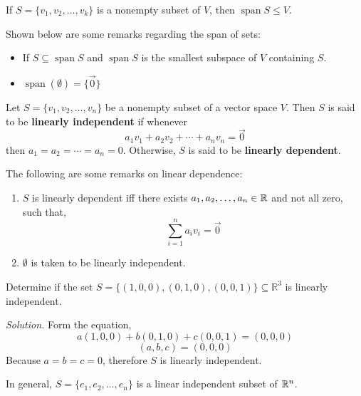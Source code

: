 \vspace{0.2cm}

\begin{theorem}
If $S = \{v_1, v_2, \dots, v_k\}$ is a nonempty subset of $V$, then $\operatorname{span}S \leq V$.
\end{theorem}

\begin{remark}Shown below are some remarks regarding the span of sets:
\begin{itemize}
    \item If $S \subseteq \operatorname{span} S$ and $\operatorname{span}S$ is the smallest subspace of $V$ containing $S$.
    \item $\operatorname{span}(\emptyset) = \{\vec{0}\}$
\end{itemize}
\end{remark}

\begin{definition}
Let $S = \{v_1, v_2, \dots, v_n\}$ be a nonempty subset of a vector space $V$. Then $S$ is said to be \textbf{linearly independent} if whenever
$$a_1v_1 + a_2v_2 + \cdots + a_nv_n = \vec{0}$$
then $a_1 = a_2 = \cdots = a_n = 0$. Otherwise, $S$ is said to be \textbf{linearly dependent}.
\end{definition}

\begin{remark}
The following are some remarks on linear dependence:
\begin{enumerate}
    \item $S$ is linearly dependent iff there exists $a_1, a_2, \dots, a_n \in \mathbb{R}$ and not all zero, such that,
    $$\sum_{i=1}^na_iv_i = \vec{0}$$
    \item $\emptyset$ is taken to be linearly independent.
\end{enumerate}
\end{remark}

\begin{example}\label{example:6.5}
Determine if the set $S = \{(1, 0, 0), (0, 1, 0), (0, 0, 1)\} \subseteq \mathbb{R}^3$ is linearly independent.

\textit{Solution.} Form the equation,
$$a(1, 0, 0) + b(0, 1, 0) + c(0, 0, 1) = (0, 0, 0)$$
$$(a, b, c) = (0, 0, 0)$$
Because $a = b = c = 0$, therefore $S$ is linearly independent.

In general, $S = \{e_1, e_2, \dots, e_n\}$ is a linear independent subset of $\mathbb{R}^n$.
\end{example}

